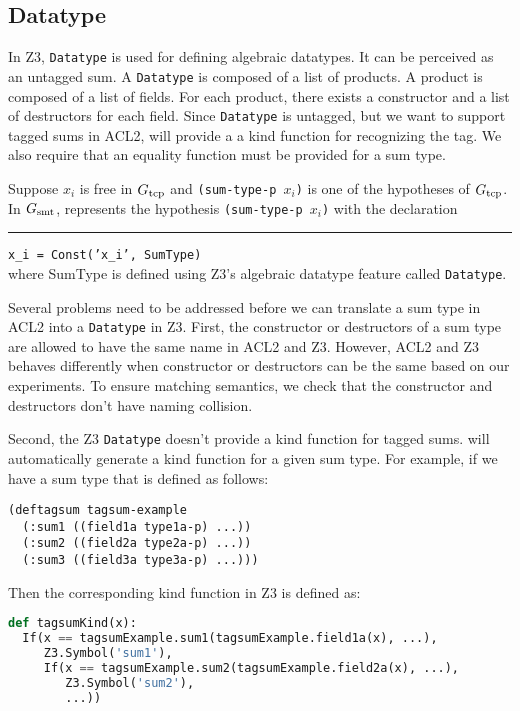 \subsection{Datatype}\label{subsec:sounddatatype}
In Z3, \texttt{Datatype} is used for defining algebraic datatypes. It can be
perceived as an untagged sum. A \texttt{Datatype} is composed of a list of
products. A product is composed of a list of fields. For each product, there
exists a constructor and a list of destructors for each field.
Since \texttt{Datatype} is untagged, but we want to support tagged sums in ACL2,
\smtlink{} will provide a a kind function for recognizing the tag.
We also require that an equality function must be provided for a sum type.

Suppose  $x_i$ is free in $G_{\mathrm{tcp}}$ and \texttt{(sum-type-p $x_i$)} is one of
the hypotheses of $G_{\mathrm{tcp}}$. In $G_{\mathrm{smt}}$, \smtlink{} represents the hypothesis
\texttt{(sum-type-p $x_i$)} with the declaration\\
\rule{2em}{0ex}\texttt{x\_i = Const('x\_i', SumType)}\\
where SumType is defined using Z3's algebraic datatype feature called \texttt{Datatype}. 

Several problems need to be addressed before we can translate a sum type in ACL2
into a \texttt{Datatype} in Z3. First, the constructor or destructors of a
sum type are allowed to have the same name in ACL2 and Z3. However, ACL2 and Z3
behaves differently when constructor or destructors can be the same based on our
experiments. To ensure matching semantics, we check that the constructor and
destructors don't have naming collision.

Second, the Z3 \texttt{Datatype} doesn't provide a kind function for tagged
sums. \smtlink{} will automatically generate a kind function for a given sum
type. For example, if we have a sum type that is defined as follows:
\begin{lstlisting}[language=LISP]
(deftagsum tagsum-example
  (:sum1 ((field1a type1a-p) ...))
  (:sum2 ((field2a type2a-p) ...))
  (:sum3 ((field3a type3a-p) ...)))
\end{lstlisting}
Then the corresponding kind function in Z3 is defined as:
\begin{lstlisting}[language=Python]
def tagsumKind(x):
  If(x == tagsumExample.sum1(tagsumExample.field1a(x), ...),
     Z3.Symbol('sum1'),
     If(x == tagsumExample.sum2(tagsumExample.field2a(x), ...),
        Z3.Symbol('sum2'),
        ...))
\end{lstlisting}

